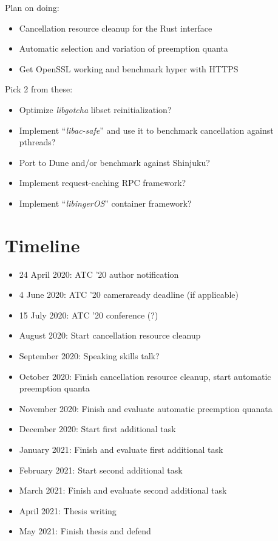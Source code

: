 \documentclass[12pt,letterpaper,openright]{report}
\begin{document}
Plan on doing:
\begin{itemize}
\item Cancellation resource cleanup for the Rust interface
\item Automatic selection and variation of preemption quanta
\item Get OpenSSL working and benchmark hyper with HTTPS
\end{itemize}

\noindent
Pick 2 from these:
\begin{itemize}
\item Optimize \textit{libgotcha} libset reinitialization?
\item Implement ``\textit{libac-safe}'' and use it to benchmark cancellation against pthreads?
\item Port to Dune and/or benchmark against Shinjuku?
\item Implement request-caching RPC framework?
\item Implement ``\textit{libingerOS}'' container framework?
\end{itemize}


\section{Timeline}

\begin{itemize}
\item 24 April 2020: ATC '20 author notification
\item 4 June 2020: ATC '20 cameraready deadline (if applicable)
\item 15 July 2020: ATC '20 conference (?)
\item August 2020: Start cancellation resource cleanup
\item September 2020: Speaking skills talk?
\item October 2020: Finish cancellation resource cleanup, start automatic preemption quanta
\item November 2020: Finish and evaluate automatic preemption quanata
\item December 2020: Start first additional task
\item January 2021: Finish and evaluate first additional task
\item February 2021: Start second additional task
\item March 2021: Finish and evaluate second additional task
\item April 2021: Thesis writing
\item May 2021: Finish thesis and defend
\end{itemize}
\end{document}

